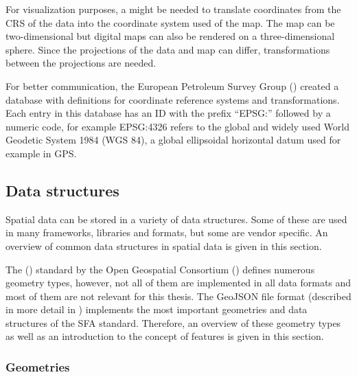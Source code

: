 		For visualization purposes, a  might be needed to translate coordinates from the CRS of the data into the coordinate system used of the map.
		The map can be two-dimensional but digital maps can also be rendered on a three-dimensional sphere.
		Since the projections of the data and map can differ, transformations between the projections are needed.
		
		For better communication, the European Petroleum Survey Group () created a database with definitions for coordinate reference systems and transformations\cite{epsg}.
		Each entry in this database has an ID with the prefix \enquote{EPSG:} followed by a numeric code, for example EPSG:4326 refers to the global and widely used World Geodetic System 1984 (WGS 84), a global ellipsoidal horizontal datum used for example in GPS.
		
	\subsection{Data structures}
	\label{subsec:data-structures}
	
		Spatial data can be stored in a variety of data structures.
		Some of these are used in many frameworks, libraries and formats, but some are vendor specific.
		An overview of common data structures in spatial data is given in this section.
		
		The  () standard by the Open Geospatial Consortium () defines numerous geometry types\cite{ogc-sfa}, however, not all of them are implemented in all data formats and most of them are not relevant for this thesis.
		The GeoJSON file format (described in more detail in ) implements the most important geometries and data structures of the SFA standard\cite{ietf-geojson}.
		Therefore, an overview of these geometry types as well as an introduction to the concept of features is given in this section.
		
		\subsubsection{Geometries}
		
